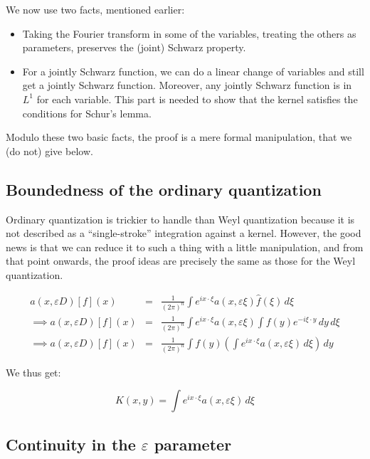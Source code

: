 \documentclass[a4paper]{amsart}
\begin{document}
We now use two facts, mentioned earlier:

\begin{itemize}

\item Taking the Fourier transform in some of the variables, treating
  the others as parameters, preserves the (joint) Schwarz property.

\item For a jointly Schwarz function, we can do a linear change of
  variables and still get a jointly Schwarz function. Moreover, any
  jointly Schwarz function is in $L^1$ for each variable. This part is
  needed to show that the kernel satisfies the conditions for Schur's
  lemma.

\end{itemize}

Modulo these two basic facts, the proof is a mere formal manipulation,
that we (do not) give below. %

\subsection{Boundedness of the ordinary quantization}

Ordinary quantization is trickier to handle than Weyl quantization
because it is not described as a ``single-stroke'' integration against
a kernel. However, the good news is that we can reduce it to such a
thing with a little manipulation, and from that point onwards, the
proof ideas are precisely the same as those for the Weyl quantization.

\begin{eqnarray*}
  a(x,\varepsilon D)[f](x) & = & \frac{1}{(2\pi)^n} \int e^{ix \cdot \xi} a(x,\varepsilon \xi) \hat{f}(\xi) \, d\xi \\
  \implies a(x,\varepsilon D)[f](x) & = & \frac{1}{(2\pi)^n} \int e^{ix \cdot \xi} a(x,\varepsilon \xi) \int f(y) e^{-i\xi \cdot y} \, dy \, d\xi\\
  \implies a(x,\varepsilon D)[f](x) & = & \frac{1}{(2\pi)^n} \int f(y) \left(\int e^{ix \cdot \xi} a(x,\varepsilon \xi) \, d\xi \right) \, dy
\end{eqnarray*}

We thus get:

$$K(x,y) = \int e^{ix \cdot \xi} a(x,\varepsilon \xi) \, d\xi$$

\subsection{Continuity in the $\varepsilon$ parameter}
\end{document}
